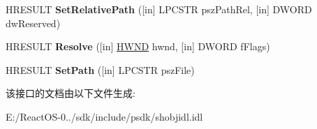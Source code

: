 \begin{DoxyCompactItemize}
H\+R\+E\+S\+U\+LT {\bfseries Set\+Relative\+Path} (\mbox{[}in\mbox{]} L\+P\+C\+S\+TR psz\+Path\+Rel, \mbox{[}in\mbox{]} D\+W\+O\+RD dw\+Reserved)
\item 
\mbox{\label{interface_i_shell_link_a_a72bf71aff34ccf6013bb86590ecd3d4e}} 
H\+R\+E\+S\+U\+LT {\bfseries Resolve} (\mbox{[}in\mbox{]} \hyperlink{interfacevoid}{H\+W\+ND} hwnd, \mbox{[}in\mbox{]} D\+W\+O\+RD f\+Flags)
\item 
\mbox{\label{interface_i_shell_link_a_a155af4163adb72e749410b5fdf0b1f38}} 
H\+R\+E\+S\+U\+LT {\bfseries Set\+Path} (\mbox{[}in\mbox{]} L\+P\+C\+S\+TR psz\+File)
\end{DoxyCompactItemize}


该接口的文档由以下文件生成\+:\begin{DoxyCompactItemize}
\item 
E\+:/\+React\+O\+S-\/0../sdk/include/psdk/shobjidl.\+idl\end{DoxyCompactItemize}
